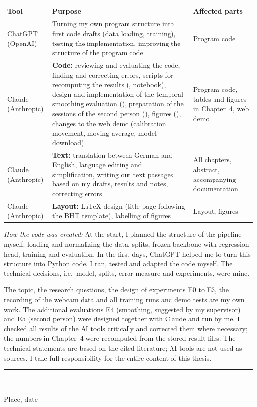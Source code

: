 \begin{center}
\footnotesize
\begin{tabularx}{\textwidth}{L{2.4cm} Y L{3.2cm}}
  \toprule
  \textbf{Tool} & \textbf{Purpose} & \textbf{Affected parts} \\
  \midrule
  ChatGPT (OpenAI) & Turning my own program structure into first code drafts
                     (data loading, training), testing the implementation,
                     improving the structure of the program code
                   & Program code \\
  \addlinespace
  Claude (Anthropic) & \textbf{Code:} reviewing and evaluating the code,
                     finding and correcting errors, scripts for recomputing
                     the results (, notebook), design and
                     implementation of the temporal smoothing evaluation
                     (), preparation of the sessions
                     of the second person (),
                     figures (), changes to the web
                     demo (calibration movement, moving average, model
                     download)
                   & Program code, tables and figures in Chapter~4, web demo \\
  \addlinespace
  Claude (Anthropic) & \textbf{Text:} translation between German and English,
                     language editing and simplification, writing out text
                     passages based on my drafts, results and notes,
                     correcting errors
                   & All chapters, abstract, accompanying documentation \\
  \addlinespace
  Claude (Anthropic) & \textbf{Layout:} LaTeX design (title page following
                     the BHT template), labelling of figures
                   & Layout, figures \\
  \bottomrule
\end{tabularx}
\end{center}

\textit{How the code was created:} At the start, I planned the structure of the
pipeline myself: loading and normalizing the data, splits, frozen backbone with
regression head, training and evaluation. In the first days, ChatGPT helped me
to turn this structure into Python code. I ran, tested and adapted the code
myself. The technical decisions, i.e.\ model, splits, error measure and
experiments, were mine.

The topic, the research questions, the design of experiments E0 to E3, the
recording of the webcam data and all training runs and demo tests are my own
work. The additional evaluations E4 (smoothing, suggested by my supervisor) and
E5 (second person) were designed together with Claude and run by me. I checked
all results of the AI tools critically and corrected them where necessary;
the numbers in Chapter~4 were recomputed from the stored result files. The
technical statements are based on the cited literature; AI tools are not used
as sources. I take full responsibility for the entire content of this thesis.

\vspace{1.2cm}
\noindent\rule{6cm}{0.4pt}\hfill\rule{6cm}{0.4pt}\\
Place, date \hfill \Autor
